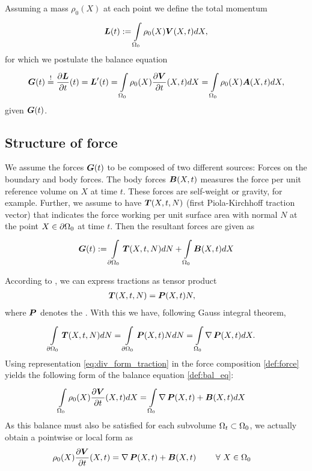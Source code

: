 Assuming a mass $\rho_0(X)$ at each point we define the total momentum
\[
 	\boldsymbol{L}(t) := \int\limits_{\Omega_0}^{} \rho_0(X)\boldsymbol{V}(X,t) dX,
\] 
for which we postulate the balance equation
\begin{align}
	\boldsymbol{G}(t) \stackrel{!}{=} \frac{\partial \boldsymbol{L}}{\partial t}(t) = \boldsymbol{L}'(t) = \int\limits_{\Omega_0}^{} \rho_0(X)\frac{\partial \boldsymbol{V}}{\partial t}(X,t) dX = \int\limits_{\Omega_0}^{} \rho_0(X)\boldsymbol{A}(X,t) dX,\label{def:bal_eq}
\end{align}
given  $\boldsymbol{G}(t)$.

\subsection{Structure of force}
We assume the forces $\boldsymbol{G}(t)$ to be composed of two different sources: Forces on the boundary and body forces.
The body forces $\boldsymbol{B}(X,t)$ measures the force per unit reference volume on $X$ at time $t$.
These forces are self-weight or gravity, for example.
Further, we assume to have  $\boldsymbol{T}(X,t,N)$ (first Piola-Kirchhoff traction vector) that indicates the force working per unit surface area with normal $N$ 
at the point $X\in\partial\Omega_0$ at time $t$.
Then the resultant forces are given as
\begin{align}
	\boldsymbol{G}(t) := \int\limits_{\partial\Omega_0}^{} \boldsymbol{T}(X,t,N)dN + \int\limits_{\Omega_0}^{} \boldsymbol{B}(X,t)dX \label{def:force}
\end{align}

According to , we can express tractions as tensor product
\begin{align}
	\boldsymbol{T}(X,t,N) &= \boldsymbol{P}(X,t)N,\label{def:T}
\end{align}
where $\boldsymbol{P}$ denotes the .
With this we have, following Gauss integral theorem,
\begin{align}
	\int\limits_{\partial\Omega_0}^{} \boldsymbol{T}(X,t,N)dN &= \int\limits_{\partial\Omega_0}^{} \boldsymbol{P}(X,t)NdN = \int\limits_{\Omega_0}^{} \operatorname{\nabla}\boldsymbol{P}(X,t)dX.\label{eq:div_form_traction}
\end{align}
Using representation \eqref{eq:div_form_traction} in the force composition 
\eqref{def:force} yields the following form of the balance equation \eqref{def:bal_eq}:
\begin{align}
	\int\limits_{\Omega_0}^{} \rho_0(X)\frac{\partial \boldsymbol{V}}{\partial t}(X,t) dX &= \int\limits_{\Omega_0}^{} \operatorname{\nabla}\boldsymbol{P}(X,t) + \boldsymbol{B}(X,t) dX
\end{align}
As this balance must also be satisfied for each subvolume $\Omega_t\subset\Omega_0$, we actually obtain a pointwise or local form as
\begin{align}
	\rho_0(X)\frac{\partial \boldsymbol{V}}{\partial t}(X,t) &= \operatorname{\nabla}\boldsymbol{P}(X,t) + \boldsymbol{B}(X,t) \qquad ~\forall~ X\in\Omega_0\label{def:maineq}
\end{align}

